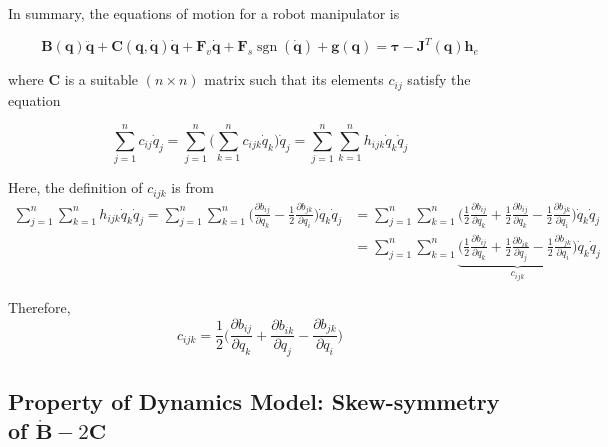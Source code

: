 \documentclass[10pt]{article}
\begin{document}
In summary, the equations of motion for a robot manipulator is

$$
\boldsymbol{B}(\boldsymbol{q}) \ddot{\boldsymbol{q}}+\boldsymbol{C}(\boldsymbol{q}, \dot{\boldsymbol{q}}) \dot{\boldsymbol{q}}+\boldsymbol{F}_{v} \dot{\boldsymbol{q}}+\boldsymbol{F}_{s} \operatorname{sgn}(\dot{\boldsymbol{q}})+\boldsymbol{g}(\boldsymbol{q})=\boldsymbol{\tau}-\boldsymbol{J}^{T}(\boldsymbol{q}) \boldsymbol{h}_{e}
$$

where $\boldsymbol{C}$ is a suitable $(n \times n)$ matrix such that its elements $c_{i j}$ satisfy the equation

$$
\sum_{j=1}^{n} c_{i j} \dot{q}_{j}=\sum_{j=1}^{n} \Big(\sum_{k=1}^{n}c_{ijk}\dot{q}_{k}\Big) \dot{q}_{j}=\sum_{j=1}^{n} \sum_{k=1}^{n} h_{i j k} \dot{q}_{k} \dot{q}_{j}
$$

Here, the definition of $c_{ijk}$ is from
$$
\begin{aligned}
    \sum_{j=1}^{n} \sum_{k=1}^{n}h_{ijk}\dot{q}_{k} \dot{q}_{j}=
\sum_{j=1}^{n} \sum_{k=1}^{n}\Big(\frac{\partial b_{i j}}{\partial q_{k}}-\frac{1}{2} \frac{\partial b_{j k}}{\partial q_{i}}\Big)\dot{q}_{k} \dot{q}_{j}
&=\sum_{j=1}^{n} \sum_{k=1}^{n}\Big(\frac{1}{2}\frac{\partial b_{i j}}{\partial q_{k}}+\frac{1}{2}\frac{\partial b_{i j}}{\partial q_{k}}-\frac{1}{2} \frac{\partial b_{j k}}{\partial q_{i}}\Big)\dot{q}_{k} \dot{q}_{j}\\
&=\sum_{j=1}^{n} \sum_{k=1}^{n}\underbrace{\Big(\frac{1}{2}\frac{\partial b_{i j}}{\partial q_{k}}+\frac{1}{2}\frac{\partial b_{i k}}{\partial q_{j}}-\frac{1}{2} \frac{\partial b_{j k}}{\partial q_{i}}\Big)}_{c_{ijk}}\dot{q}_{k} \dot{q}_{j}
\end{aligned}
$$

Therefore, 
$$
c_{ijk}=\frac{1}{2}\Big(\frac{\partial b_{i j}}{\partial q_{k}}+\frac{\partial b_{i k}}{\partial q_{j}}- \frac{\partial b_{j k}}{\partial q_{i}}\Big)
$$

\subsection{Property of Dynamics Model: Skew-symmetry of $\dot{\boldsymbol{B}}-2\boldsymbol{C}$}

\end{document}
